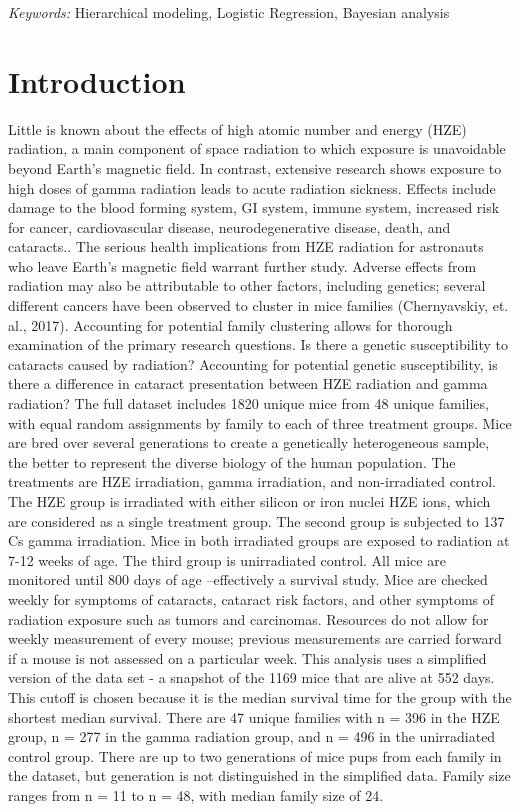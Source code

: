 \documentclass[12pt]{article}
\begin{document}
\noindent%
{\it Keywords:} Hierarchical modeling, Logistic Regression, Bayesian analysis
\vfill

\newpage
{} %

\section{Introduction}
\label{sec:intro}

Little is known about the effects of high atomic number and energy (HZE) radiation, a main component of space radiation to which exposure is unavoidable beyond Earth's magnetic field. In contrast, extensive research shows exposure to high doses of gamma radiation leads to acute radiation sickness. Effects include damage to the blood forming system, GI system, immune system, increased risk for cancer, cardiovascular disease, neurodegenerative disease, death, and cataracts.. The serious health implications from HZE radiation for astronauts who leave Earth's magnetic field warrant further study. Adverse effects from radiation may also be attributable to other factors, including genetics; several different cancers have been observed to cluster in mice families (Chernyavskiy, et. al., 2017). Accounting for potential family clustering allows for thorough examination of the primary research questions. Is there a genetic susceptibility to cataracts caused by radiation? Accounting for potential genetic susceptibility, is there a difference in cataract presentation between HZE radiation and gamma radiation? The full dataset includes 1820 unique mice from 48 unique families, with equal random assignments by family to each of three treatment groups. Mice are bred over several generations to create a genetically heterogeneous sample, the better to represent the diverse biology of the human population. The treatments are HZE irradiation, gamma irradiation, and non-irradiated control. The HZE group is irradiated with either silicon or iron nuclei HZE ions, which are considered as a single treatment group. The second group is subjected to 137 Cs gamma irradiation. Mice in both irradiated groups are exposed to radiation at 7-12 weeks of age. The third group is unirradiated control. All mice are monitored until 800 days of age --effectively a survival study. Mice are checked weekly for symptoms of cataracts, cataract risk factors, and other symptoms of radiation exposure such as tumors and carcinomas. Resources do not allow for weekly measurement of every mouse; previous measurements are carried forward if a mouse is not assessed on a particular week. This analysis uses a simplified version of the data set - a snapshot of the 1169 mice that are alive at 552 days. This cutoff is chosen because it is the median survival time for the group with the shortest median survival. There are 47 unique families with n = 396 in the HZE group, n = 277 in the gamma radiation group, and n = 496 in the unirradiated control group. There are up to two generations of mice pups from each family in the dataset, but generation is not distinguished in the simplified data. Family size ranges from n = 11 to n = 48, with median family size of 24.
\end{document}
